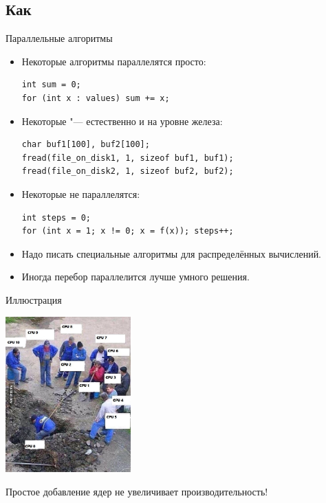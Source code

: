 \subsection{Как}
\begin{frame}[fragile]{Параллельные алгоритмы}
	\begin{itemize}
		\item Некоторые алгоритмы параллелятся просто:
\begin{verbatim}
int sum = 0;
for (int x : values) sum += x;
\end{verbatim}
		\item Некоторые "--- естественно и на уровне железа:
\begin{verbatim}
char buf1[100], buf2[100];
fread(file_on_disk1, 1, sizeof buf1, buf1);
fread(file_on_disk2, 1, sizeof buf2, buf2);
\end{verbatim}
		\item Некоторые не параллелятся:
\begin{verbatim}
int steps = 0;
for (int x = 1; x != 0; x = f(x)); steps++;
\end{verbatim}
		\item Надо писать специальные алгоритмы для распределённых вычислений.
		\item Иногда перебор параллелится лучше умного решения.
	\end{itemize}
\end{frame}

\begin{frame}{Иллюстрация}
	\begin{center}
		\includegraphics[height=6cm]{cpus-joke.jpg}

		Простое добавление ядер не увеличивает производительность!
	\end{center}
\end{frame}

